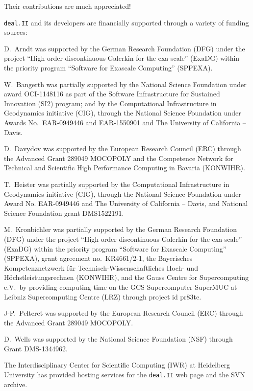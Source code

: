 \documentclass{ansarticle-preprint}
\newcommand{\specialword}[1]{\texttt{#1}}
\newcommand{\dealii}{{\specialword{deal.II}}}
\begin{document}
Their contributions are much appreciated!


\bigskip

\dealii{} and its developers are financially supported through a
variety of funding sources:

D.~Arndt was supported by the German Research Foundation (DFG) under the
project ``High-order discontinuous Galerkin for the exa-scale'' (ExaDG) within the
priority program ``Software for Exascale Computing'' (SPPEXA).

W.~Bangerth was partially
supported by the National Science Foundation under award OCI-1148116
as part of the Software Infrastructure for Sustained Innovation (SI2)
program; and by the Computational Infrastructure in Geodynamics initiative
(CIG), through the National Science Foundation under Awards
No.~EAR-0949446 and EAR-1550901 and The University of California -- Davis.

D.~Davydov was supported by the European Research Council (ERC) through the Advanced Grant 289049 MOCOPOLY and the Competence Network for Technical and Scientific High Performance Computing in Bavaria (KONWIHR).

T.~Heister was partially supported by the Computational Infrastructure in
Geodynamics initiative (CIG), through the National Science Foundation
under Award No. EAR-0949446 and The University of California -- Davis, and National Science Foundation grant DMS1522191.

M.~Kronbichler was partially supported by the German Research Foundation (DFG)
under the project ``High-order discontinuous Galerkin for the exa-scale''
(ExaDG) within the priority program ``Software for Exascale Computing''
(SPPEXA), grant agreement no.~KR4661/2-1, the Bayerisches Kompetenznetzwerk
f\"ur Technisch-Wissenschaftliches Hoch- und H\"ochstleistungsrechnen
(KONWIHR), and the Gauss Centre for Supercomputing e.V.~by providing computing
time on the GCS Supercomputer SuperMUC at Leibniz Supercomputing Centre (LRZ)
through project id pr83te.

J-P.~Pelteret was supported by the European Research Council (ERC) through the Advanced Grant 289049 MOCOPOLY.

D.~Wells was supported by the National Science Foundation (NSF) through Grant
DMS-1344962.

The Interdisciplinary Center for Scientific Computing (IWR) at Heidelberg University has provided
hosting services for the \dealii{} web page and the SVN archive.


{}

\end{document}

